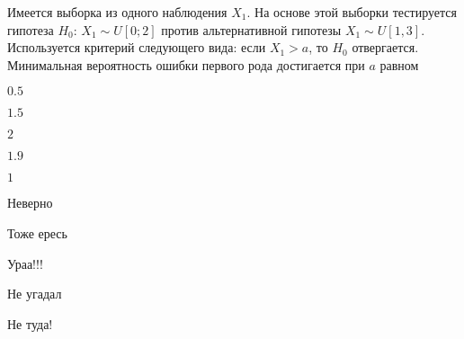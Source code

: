 
\begin{question}
Имеется выборка из одного наблюдения \(X_1\). На основе этой выборки
тестируется гипотеза \(H_0\): \(X_1 \sim U[0;2]\) против альтернативной
гипотезы \(X_1 \sim U[1,3]\). Используется критерий следующего вида:
если \(X_1>a\), то \(H_0\) отвергается. Минимальная вероятность ошибки
первого рода достигается при \(a\) равном
\begin{answerlist}
  \item \(0.5\)
  \item \(1.5\)
  \item \(2\)
  \item \(1.9\)
  \item \(1\)
\end{answerlist}
\end{question}

\begin{solution}
\begin{answerlist}
  \item Неверно
  \item Тоже ересь
  \item Ураа!!!
  \item Не угадал
  \item Не туда!
\end{answerlist}
\end{solution}

